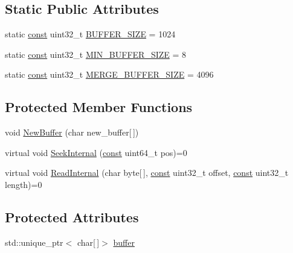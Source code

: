 \subsection*{Static Public Attributes}
\begin{DoxyCompactItemize}
\item 
static \mbox{\hyperlink{ZlibCrc32_8h_a2c212835823e3c54a8ab6d95c652660e}{const}} uint32\+\_\+t \mbox{\hyperlink{classlucene_1_1core_1_1store_1_1BufferedIndexInput_a6a920fd0b588aa1c0851aa664f06fc99}{B\+U\+F\+F\+E\+R\+\_\+\+S\+I\+ZE}} = 1024
\item 
static \mbox{\hyperlink{ZlibCrc32_8h_a2c212835823e3c54a8ab6d95c652660e}{const}} uint32\+\_\+t \mbox{\hyperlink{classlucene_1_1core_1_1store_1_1BufferedIndexInput_a438bb9ff0bde9c91e2f97ad4d7c1f3d9}{M\+I\+N\+\_\+\+B\+U\+F\+F\+E\+R\+\_\+\+S\+I\+ZE}} = 8
\item 
static \mbox{\hyperlink{ZlibCrc32_8h_a2c212835823e3c54a8ab6d95c652660e}{const}} uint32\+\_\+t \mbox{\hyperlink{classlucene_1_1core_1_1store_1_1BufferedIndexInput_a5b9e59d48b6e7621f24fd6754aff5cbc}{M\+E\+R\+G\+E\+\_\+\+B\+U\+F\+F\+E\+R\+\_\+\+S\+I\+ZE}} = 4096
\end{DoxyCompactItemize}
\subsection*{Protected Member Functions}
\begin{DoxyCompactItemize}
\item 
void \mbox{\hyperlink{classlucene_1_1core_1_1store_1_1BufferedIndexInput_a9d09904fad10a9cc0a1a3f843a000183}{New\+Buffer}} (char new\+\_\+buffer\mbox{[}$\,$\mbox{]})
\item 
virtual void \mbox{\hyperlink{classlucene_1_1core_1_1store_1_1BufferedIndexInput_a1472af5949043504554bff5e792898be}{Seek\+Internal}} (\mbox{\hyperlink{ZlibCrc32_8h_a2c212835823e3c54a8ab6d95c652660e}{const}} uint64\+\_\+t pos)=0
\item 
virtual void \mbox{\hyperlink{classlucene_1_1core_1_1store_1_1BufferedIndexInput_a1af5051db8ec61ea83c96968fd998543}{Read\+Internal}} (char byte\mbox{[}$\,$\mbox{]}, \mbox{\hyperlink{ZlibCrc32_8h_a2c212835823e3c54a8ab6d95c652660e}{const}} uint32\+\_\+t offset, \mbox{\hyperlink{ZlibCrc32_8h_a2c212835823e3c54a8ab6d95c652660e}{const}} uint32\+\_\+t length)=0
\end{DoxyCompactItemize}
\subsection*{Protected Attributes}
\begin{DoxyCompactItemize}
\item 
std\+::unique\+\_\+ptr$<$ char\mbox{[}$\,$\mbox{]}$>$ \mbox{\hyperlink{classlucene_1_1core_1_1store_1_1BufferedIndexInput_a3dab3d3073a1e2594b6abffa6705a49d}{buffer}}
\end{DoxyCompactItemize}
